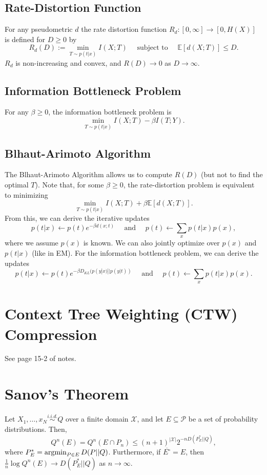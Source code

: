\documentclass{article}
\newcommand{\X}{\mathcal{X}}                        %
\newcommand{\E}{\mathbb{E}}                         %
\newcommand{\Pds}{\mathcal{P}}
\newcommand{\argmin}{\operatornamewithlimits{argmin}}   %
\begin{document}
\subsection{Rate-Distortion Function}
For any pseudometric $d$ the rate distortion function
$R_d : [0,\infty] \to [0,H(X)]$ is defined for $D \geq 0$ by
\[R_d(D)
    := \min_{T \sim p(t|x)} I(X;T)
    \quad \mbox{ subject to } \quad
    \E[d(X;T)] \leq D.
\]
$R_d$ is non-increasing and convex, and $R(D) \to 0$ as $D \to \infty$.

\subsection{Information Bottleneck Problem}
For any $\beta \geq 0$, the information bottleneck problem is
\[\min_{T \sim p(t|x)} I(X;T) - \beta I(T;Y).\]

\subsection{Blhaut-Arimoto Algorithm}
The Blhaut-Arimoto Algorithm allows us to compute $R(D)$ (but not to find the
optimal $T$). Note that, for some $\beta \geq 0$, the rate-distortion problem
is equivalent to minimizing
\[\min_{T \sim p(t|x)} I(X;T) + \beta \E[d(X;T)].\]
From this, we can derive the iterative updates
\[p(t|x) \gets p(t) e^{-\beta d(x;t)}
    \quad \mbox{ and } \quad
    p(t) \gets \sum_x p(t|x) p(x),\]
where we assume $p(x)$ is known. We can also jointly optimize over $p(x)$ and
$p(t|x)$ (like in EM). For the information bottleneck problem, we can derive
the updates
\[p(t|x) \gets p(t) e^{-\beta D_{KL}(p(y|x)||p(y|t))}
    \quad \mbox{ and } \quad
    p(t) \gets \sum_x p(t|x) p(x).\]

\section{Context Tree Weighting (CTW) Compression}
See page 15-2 of notes.

\section{Sanov's Theorem}
Let $X_1,\dots,x_N \stackrel{i.i.d.}{\sim} Q$ over a finite domain $\X$,
and let $E \subseteq \Pds$ be a set of probability distributions. Then,
\[Q^n(E) = Q^n(E \cap P_n) \leq (n + 1)^{|\X|}2^{-nD(P_E^*||Q)},\]
where $P_E^* = \argmin_{P \in E} D(P||Q)$. Furthermore, if
$\overline{E^\circ} = E$, then
$\frac1n \log Q^n(E) \to D(P_E^*||Q)$ as $n \to \infty$.
\end{document}
